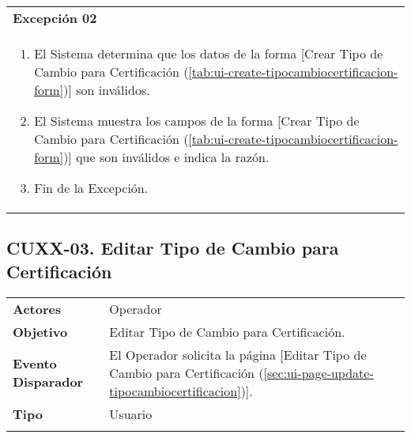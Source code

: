 \begin{tabular}{ p{15.5cm} }
	\textbf{Excepción 02} \\
	\begin{enumerate}
		\item El Sistema determina que los datos de la forma [Crear Tipo de Cambio para Certificación (\ref{tab:ui-create-tipocambiocertificacion-form})] son inválidos.
		\item El Sistema muestra los campos de la forma [Crear Tipo de Cambio para Certificación (\ref{tab:ui-create-tipocambiocertificacion-form})] que son inválidos e indica la razón.
		\item Fin de la Excepción.
	\end{enumerate}
\end{tabular}


\clearpage
\subsection{CUXX-03. Editar Tipo de Cambio para Certificación} \label{sec:cu-update-TipoCambioCertificacion}

\begin{tabular}{ p{3.5cm} p{11.5cm} }
	\textbf{Actores} & Operador\\
	\textbf{Objetivo} & Editar Tipo de Cambio para Certificación.\\
	\textbf{Evento Disparador} & El Operador solicita la página [Editar Tipo de Cambio para Certificación (\ref{sec:ui-page-update-tipocambiocertificacion})].\\
	\textbf{Tipo} & Usuario\\
	\\
\end{tabular}

